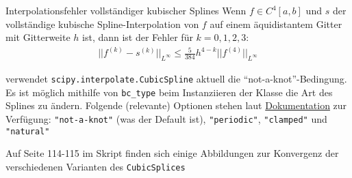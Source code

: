 \begin{theorem}[]{Interpolationsfehler vollständiger kubischer Splines}
    Wenn $f \in C^4[a, b]$ und $s$ der vollständige kubische Spline-Interpolation von $f$ auf einem äquidistantem Gitter mit Gitterweite $h$ ist, 
    dann ist der Fehler für $k = 0, 1, 2, 3$:
    \begin{align*}
        ||f^{(k)} - s^{(k)}||_{L^\infty} \leq \frac{5}{384} h^{4 - k} ||f^{(4)}||_{L^\infty}
    \end{align*}
\end{theorem}

\innumpy verwendet \texttt{scipy.interpolate.CubicSpline} aktuell die ``not-a-knot''-Bedingung. 
Es ist möglich mithilfe von \texttt{bc\_type} beim Instanziieren der Klasse die Art des Splines zu ändern.
Folgende (relevante) Optionen stehen laut 
\color{NavyBlue}\href{https://docs.scipy.org/doc/scipy/reference/generated/scipy.interpolate.CubicSpline.html}{Dokumentation}\color{black}\smallhspace
zur Verfügung: \texttt{"not-a-knot"} (was der Default ist), \texttt{"periodic"}, \texttt{"clamped"} und \texttt{"natural"}

Auf Seite 114-115 im Skript finden sich einige Abbildungen zur Konvergenz der verschiedenen Varianten des \texttt{CubicSplices}
